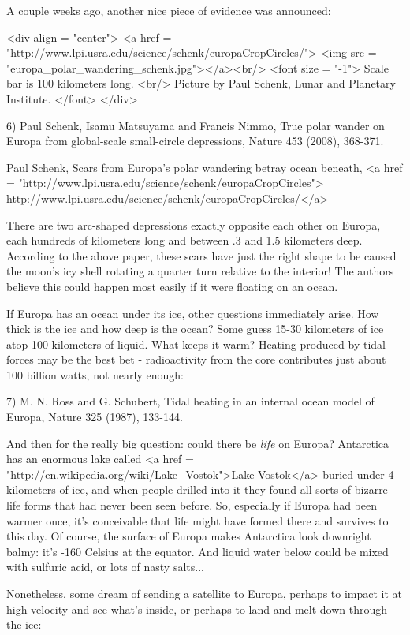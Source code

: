A couple weeks ago, another nice piece of evidence was announced:

<div align = "center">
<a href = "http://www.lpi.usra.edu/science/schenk/europaCropCircles/">
<img src = "europa_polar_wandering_schenk.jpg"></a><br/>
<font size = "-1"> 
Scale bar is 100 kilometers long.
<br/>
Picture by Paul Schenk, Lunar and Planetary Institute.
</font>
</div>

6) Paul Schenk, Isamu Matsuyama and Francis Nimmo, True polar wander 
on Europa from global-scale small-circle depressions, Nature 453 (2008),
368-371.

Paul Schenk, Scars from Europa's polar wandering betray ocean beneath, 
<a href = "http://www.lpi.usra.edu/science/schenk/europaCropCircles">
http://www.lpi.usra.edu/science/schenk/europaCropCircles/</a>

There are two arc-shaped depressions exactly opposite each other on
Europa, each hundreds of kilometers long and between .3 and 1.5 kilometers
deep.  According to the above paper, these scars have just the right shape 
to be caused the moon's icy shell rotating a quarter turn relative to
the interior!  The authors believe this could happen most easily if 
it were floating on an ocean.

If Europa has an ocean under its ice, other questions immediately arise.  
How thick is the ice and how deep is the ocean?  Some guess 15-30 kilometers
of ice atop 100 kilometers of liquid.  What keeps it warm?  Heating
produced by tidal forces may be the best bet - radioactivity from the core 
contributes just about 100 billion watts, not nearly enough:

7) M. N. Ross and G. Schubert, Tidal heating in an internal ocean model
of Europa, Nature 325 (1987), 133-144.

And then for the really big question: could there be \emph{life} on Europa?
Antarctica has an enormous lake called <a href = "http://en.wikipedia.org/wiki/Lake_Vostok">Lake Vostok</a> buried under 4 kilometers 
of ice, and when people drilled into it they found all sorts of bizarre 
life forms that had never been seen before.  So, especially if Europa had
been warmer once, it's conceivable that life might have formed there and 
survives to this day.  Of course, the surface of Europa makes Antarctica 
look downright balmy: it's -160 Celsius at the equator.  And liquid water 
below could be mixed with sulfuric acid, or lots of nasty salts...

Nonetheless, some dream of sending a satellite to Europa, perhaps 
to impact it at high velocity and see what's inside, or perhaps to land
and melt down through the ice:

